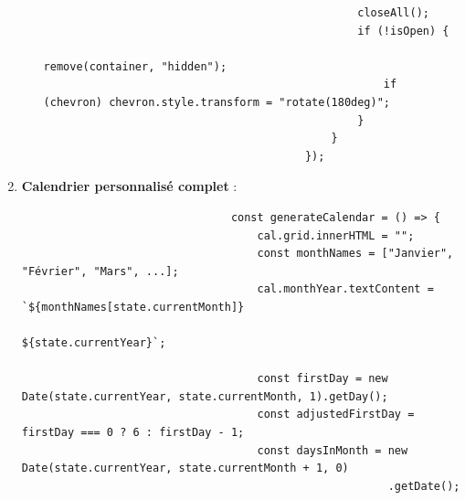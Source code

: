 \documentclass[a4paper,11pt]{article}
\begin{document}
\begin{enumerate}
\begin{itemize}
\begin{tcolorbox}[colback=lightgray!5, colframe=gray!80, left=-70mm, right=5mm, top=2mm, bottom=0mm, boxrule=0.1mm]
\begin{verbatim}
                                                closeAll();
                                                if (!isOpen) {
                                                    remove(container, "hidden");
                                                    if (chevron) chevron.style.transform = "rotate(180deg)";
                                                }
                                            }
                                        });
                                    \end{verbatim}
                                \end{tcolorbox}
                        \end{itemize}
                        

                    \item \textbf{Calendrier personnalisé complet} :
                        \begin{tcolorbox}[colback=lightgray!5, colframe=gray!80, left=-65mm, right=5mm, top=2mm, bottom=0mm, boxrule=0.1mm]
                            \begin{verbatim}
                                const generateCalendar = () => {
                                    cal.grid.innerHTML = "";
                                    const monthNames = ["Janvier", "Février", "Mars", ...];
                                    cal.monthYear.textContent = `${monthNames[state.currentMonth]} 
                                                                ${state.currentYear}`;

                                    const firstDay = new Date(state.currentYear, state.currentMonth, 1).getDay();
                                    const adjustedFirstDay = firstDay === 0 ? 6 : firstDay - 1;
                                    const daysInMonth = new Date(state.currentYear, state.currentMonth + 1, 0)
                                                        .getDate();


\end{verbatim}
\end{tcolorbox}
\end{enumerate}
\end{document}

